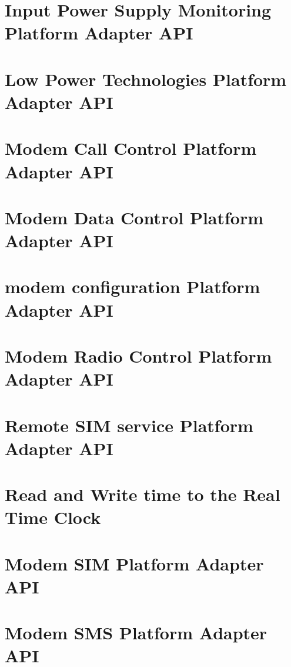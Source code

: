 \documentclass[twoside]{book}
\newcommand{\+}{\discretionary{\mbox{\scriptsize$\hookleftarrow$}}{}{}}
\begin{document}
\chapter{Input Power Supply Monitoring Platform Adapter A\+PI}
\label{c_pa_ips}
\hypertarget{c_pa_ips}{}

\chapter{Low Power Technologies Platform Adapter A\+PI}
\label{c_pa_lpt}
\hypertarget{c_pa_lpt}{}

\chapter{Modem Call Control Platform Adapter A\+PI}
\label{c_pa_mcc}
\hypertarget{c_pa_mcc}{}

\chapter{Modem Data Control Platform Adapter A\+PI}
\label{c_pa_mdc}
\hypertarget{c_pa_mdc}{}

\chapter{modem configuration Platform Adapter A\+PI}
\label{c_pa_mdmCfg}
\hypertarget{c_pa_mdmCfg}{}

\chapter{Modem Radio Control Platform Adapter A\+PI}
\label{c_pa_mrc}
\hypertarget{c_pa_mrc}{}

\chapter{Remote S\+IM service Platform Adapter A\+PI}
\label{c_pa_rsim}
\hypertarget{c_pa_rsim}{}

\chapter{Read and Write time to the Real Time Clock}
\label{c_pa_rtc}
\hypertarget{c_pa_rtc}{}

\chapter{Modem S\+IM Platform Adapter A\+PI}
\label{c_pa_sim}
\hypertarget{c_pa_sim}{}

\chapter{Modem S\+MS Platform Adapter A\+PI}
\label{c_pa_sms}
\hypertarget{c_pa_sms}{}

\end{document}
